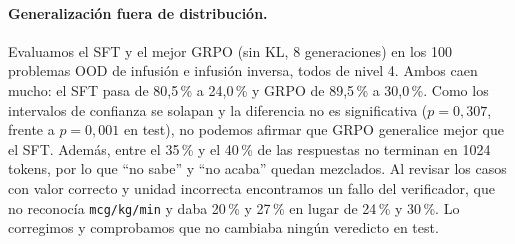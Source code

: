 \paragraph{Generalización fuera de distribución.}
Evaluamos el SFT y el mejor GRPO (sin KL, 8 generaciones) en los 100 problemas OOD de infusión e infusión inversa, todos de nivel 4. Ambos caen mucho: el SFT pasa de 80,5\,\% a 24,0\,\% y GRPO de 89,5\,\% a 30,0\,\%. Como los intervalos de confianza se solapan y la diferencia no es significativa ($p=0{,}307$, frente a $p=0{,}001$ en test), no podemos afirmar que GRPO generalice mejor que el SFT. Además, entre el 35\,\% y el 40\,\% de las respuestas no terminan en 1024 tokens, por lo que ``no sabe'' y ``no acaba'' quedan mezclados. Al revisar los casos con valor correcto y unidad incorrecta encontramos un fallo del verificador, que no reconocía \texttt{mcg/kg/min} y daba 20\,\% y 27\,\% en lugar de 24\,\% y 30\,\%. Lo corregimos y comprobamos que no cambiaba ningún veredicto en test.
